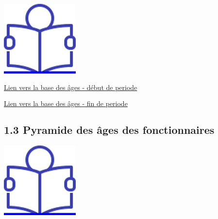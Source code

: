 \href{../Docs/Notices/fiche_1.odt}{\includegraphics{icones/Notice.png}}

\href{../Bases/Effectifs/Pyramide-des-ages-des-personnels_2009.csv}{Lien
vers la base des âges - début de periode}

\href{../Bases/Effectifs/Pyramide-des-ages-des-personnels_2013.csv}{Lien
vers la base des âges - fin de periode}

\hypertarget{pyramide-des-ages-des-fonctionnaires}{%
\subsection{1.3 Pyramide des âges des fonctionnaires
~}\label{pyramide-des-ages-des-fonctionnaires}}

\href{../Docs/Notices/fiche_2.odt}{\includegraphics{icones/Notice.png}}

